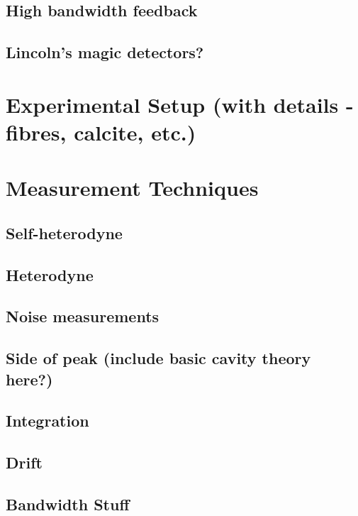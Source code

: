 \subsection{High bandwidth feedback}
\subsection{Lincoln's magic detectors?}
\section{Experimental Setup (with details - fibres, calcite, etc.)}
\section{Measurement Techniques}
\subsection{Self-heterodyne}
\subsection{Heterodyne}
\subsection{Noise measurements}
\subsection{Side of peak (include basic cavity theory here?)}
\subsection{Integration}
\subsection{Drift}
\subsection{Bandwidth Stuff}
